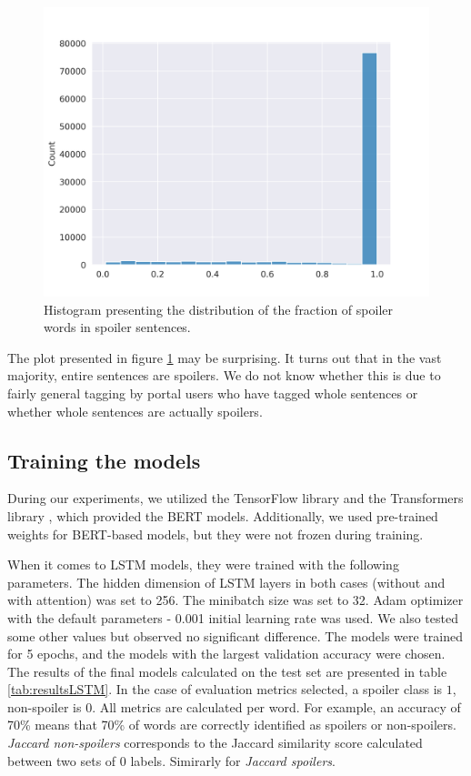 \documentclass[11pt]{article}
\begin{document}
\begin{figure}
    \centering
    \includegraphics[width=\columnwidth]{img/eda/how_much_of_spoiler_is_in_spoiler_sentence.png}
    \caption{Histogram presenting the distribution of the fraction of spoiler words in spoiler sentences.} 
    \label{fig:how_much_of_spoiler_is_in_spoiler_sentence}
\end{figure}

The plot presented in figure \ref{fig:how_much_of_spoiler_is_in_spoiler_sentence} may be surprising. It turns out that in the vast majority, entire sentences are spoilers. We do not know whether this is due to fairly general tagging by portal users who have tagged whole sentences or whether whole sentences are actually spoilers.


\subsection{Training the models}
During our experiments, we utilized the TensorFlow library \cite{abadi2016tensorflow} and the Transformers library \cite{wolf2020transformers}, which provided the BERT models. Additionally, we used pre-trained weights for BERT-based models, but they were not frozen during training.

When it comes to LSTM models, they were trained with the following parameters. The hidden dimension of LSTM layers in both cases (without and with attention) was set to 256. The minibatch size was set to 32. Adam optimizer with the default parameters - 0.001 initial learning rate was used. We also tested some other values but observed no significant difference. The models were trained for 5 epochs, and the models with the largest validation accuracy were chosen. The results of the final models calculated on the test set are presented in table \ref{tab:resultsLSTM}. In the case of evaluation metrics selected, a spoiler class is $1$, non-spoiler is $0$. All metrics are calculated per word. For example, an accuracy of 70\% means that 70\% of words are correctly identified as spoilers or non-spoilers. \textit{Jaccard non-spoilers} corresponds to the Jaccard similarity score calculated between two sets of $0$ labels. Simirarly for \textit{Jaccard spoilers}.
\end{document}
